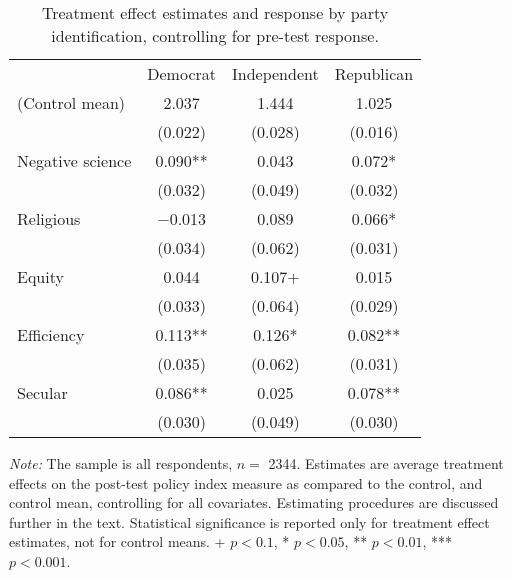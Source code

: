 \begin{table*}

\caption{Treatment effect estimates and response by party identification, controlling for pre-test response.\label{tab:party_lin_all}}
\centering
\begin{threeparttable}
\begin{tabular}[t]{lccc}
\toprule
  & Democrat & Independent & Republican\\
\cmidrule(lr){2-2} \cmidrule(lr){3-3} \cmidrule(lr){4-4}
(Control mean) & \num{2.037} & \num{1.444} & \num{1.025}\\
 & (\num{0.022}) & (\num{0.028}) & (\num{0.016})\\
Negative science & \num{0.090}** & \num{0.043} & \num{0.072}*\\
 & (\num{0.032}) & (\num{0.049}) & (\num{0.032})\\
Religious & \num{-0.013} & \num{0.089} & \num{0.066}*\\
 & (\num{0.034}) & (\num{0.062}) & (\num{0.031})\\
Equity & \num{0.044} & \num{0.107}+ & \num{0.015}\\
 & (\num{0.033}) & (\num{0.064}) & (\num{0.029})\\
Efficiency & \num{0.113}** & \num{0.126}* & \num{0.082}**\\
 & (\num{0.035}) & (\num{0.062}) & (\num{0.031})\\
Secular & \num{0.086}** & \num{0.025} & \num{0.078}**\\
 & (\num{0.030}) & (\num{0.049}) & (\num{0.030})\\
\bottomrule
\end{tabular}
\begin{tablenotes}
\item \footnotesize \textit{Note:} The sample is all respondents, $n = $ \num{2344}. Estimates are average treatment effects on the post-test policy index measure as compared to the control, and control mean, controlling for all covariates. Estimating procedures are discussed further in the text. Statistical significance is reported only for treatment effect estimates, not for control means. + $p < 0.1$, * $p < 0.05$, ** $p < 0.01$, *** $p < 0.001$.
\end{tablenotes}
\end{threeparttable}
\end{table*}
